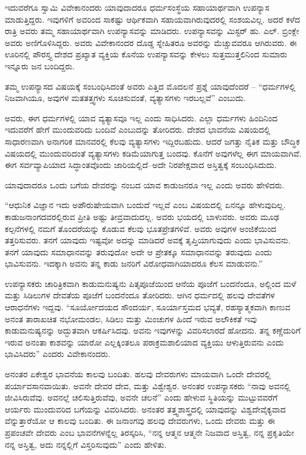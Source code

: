 ಇದುವರೆಗೂ ಸ್ವಾಮಿ ವಿವೇಕಾನಂದರು ಯಾವುದಾದರೂ ಧರ್ಮಸಂಸ್ಥೆಯ ಸಹಾ\break ಯಾರ್ಥವಾಗಿ ಉಪನ್ಯಾಸ ಮಾಡುತ್ತಿದ್ದರು. ಇವುಗಳಿಗೆ ಅವರಿಂದ ಸಾಕಷ್ಟು ಆರ್ಥಿಕವಾಗಿ ಸಹಾಯವಾಗಿರುವುದರಲ್ಲಿ ಸಂಶಯವಿಲ್ಲ. ಅದರೆ ಕಳೆದ ರಾತ್ರಿ ಅವರು ತಮ್ಮ ಸಹಾಯಾರ್\break ಥವಾಗಿ ಉಪನ್ಯಾಸವನ್ನು ಮಾಡಿದರು. ಉಪನ್ಯಾಸವನ್ನು ಮಿಸ್ಟರ್​ ಹು. ಎಲ್​. ಬ್ರಿಂಕ್ಲೇ ಅವರು ಅಣಿಗೊಳಿಸಿದ್ದರು. ಅವರು ವಿವೇಕಾನಂದರ ದೊಡ್ಡ ಸ್ನೇಹಿತರೂ ಅವರನ್ನು ಮೆಚ್ಚುವವರೂ ಆಗಿರುವರು. ಈ ಊರಿನಲ್ಲಿ ಪೌರಸ್ತ್ಯ ದೇಶದ ಪ್ರಖ್ಯಾತ ವ್ಯಕ್ತಿಯ ಕೊನೆಯ ಉಪನ್ಯಾಸವನ್ನು ಕೇಳಲು ಸುತ್ತಮುತ್ತಲಿನಿಂದ ಸುಮಾರು ಇನ್ನೂರು ಜನ ಬಂದಿದ್ದರು.

ತಮ್ಮ ಉಪನ್ಯಾಸದ ವಿಷಯಕ್ಕೆ ಸಂಬಂಧಿಸಿದಂತೆ ಅವರು ಎತ್ತಿದ ಮೊದಲನೆ ಪ್ರಶ್ನೆ ಯಾವುದೆಂದರೆ – “ಧರ್ಮಗಳಲ್ಲಿ ನಿಜವಾಗಿಯೂ, ಅವುಗಳ ಮತತತ್ತ್ವಗಳು ಸೂಚಿಸು\break ವಂತೆ, ವ್ಯತ್ಯಾಸಗಳು ಇರಬಲ್ಲವೆ” ಎಂಬುದು.

ಅವರು, ಈಗ ಧರ್ಮಗಳಲ್ಲಿ ಯಾವ ವ್ಯತ್ಯಾಸವೂ ಇಲ್ಲ ಎಂದು ಸಾಧಿಸಿದರು. ಎಲ್ಲಾ ಧರ್ಮಗಳು ಹಿಂದಿನಿಂದ ಇದುವರೆಗೆ ಹೇಗೆ ಮುಂದುವರಿದು ಬಂದಿವೆ ಎಂಬುದನ್ನು ತೋರಿದರು. ದೇಶದ ಭಾವನೆಯ ವಿಷಯದಲ್ಲಿ ಸಾಧಾರಣವಾಗಿ ಅನಾಗರಿಕ ಮಾನವರಲ್ಲಿ ಕೆಲವು ವ್ಯತ್ಯಾಸಗಳು ಇದ್ದಿರಬಹುದು. ಆದರೆ ಜಗತ್ತು ನೈತಿಕ ಮತ್ತು ಬೌದ್ಧಿಕ ವಿಷಯದಲ್ಲಿ ಮುಂದುವರಿದಂತೆ ವ್ಯತ್ಯಾಸಗಳು ಕಡಿಮೆಯಾಗುತ್ತ ಬಂದವು. ಕೊನೆಗೆ ಅವುಗಳೆಲ್ಲ ಈಗ ಮಾಯವಾಗಿವೆ. ಈಗ ಸರ್ವವ್ಯಾಪಿಯಾದ ಸಿದ್ಧಾಂತವೊಂದು ಜಾರಿಯಲ್ಲಿದೆ–ಅದೇ ನಿರಪೇಕ್ಷವಾದ ಅಸ್ತಿತ್ವಕ್ಕೆ ಸಂಬಂಧಿಸಿದುದು.

ಯಾವುದಾದರೂ ಒಂದು ಬಗೆಯ ದೇವರನ್ನು ನಂಬದ ಯಾವ ಕಾಡುಜನರೂ ಇಲ್ಲ ಎಂದು ಅವರು ಹೇಳಿದರು.

“ಆಧುನಿಕ ವಿಜ್ಞಾನ ಇದು ಅಪೌರುಷೇಯವಾಗಿ ಬಂದುದೆ ಇಲ್ಲವೆ ಎಂಬ ವಿಷಯದಲ್ಲಿ ಏನನ್ನೂ ಹೇಳುವುದಿಲ್ಲ. ಕಾಡುಜನಾಂಗದವರಲ್ಲಿರುವ ಪ್ರೀತಿ ಅಷ್ಟು ತೀವ್ರವಾದುದಲ್ಲ. ಅವರು ಭಯದಲ್ಲಿ ಬಾಳುವರು. ಅವರು ಮೂಢ ಕಲ್ಪನೆಗಳಲ್ಲಿ ನಮಗೆ ತೊಂದರೆಯನ್ನು ಕೊಡುವ ಕೆಲವು ಭೂತಪ್ರೇತಗಳಿವೆ. ಅವರು ಅವುಗಳ ಅಂಜಿಕೆಯಿಂದ ತತ್ತರಿಸುವರು. ತನಗೆ ಯಾವುದು ಇಷ್ಟವೋ ಅದನ್ನು ಮಾಡಿದರೆ ಅವಕ್ಕೆ ತೃಪ್ತಿಯಾಗುವುದು ಎಂದು ಭಾವಿಸುವನು. ತನಗೆ ಯಾವುದು ಸಮಾಧಾನವನ್ನು ತರುವುದೋ ಅದೇ ಆ ಪ್ರೇತಕ್ಕೂ ಸಮಾಧಾನವನ್ನು ತರುವುದು ಎಂದು ಭಾವಿಸುವನು. ಇದಕ್ಕಾಗಿ ಅವನು ತನ್ನ ಕಾಡು ಜನರಿಗೆ ವಿರೋಧವಾಗಿಯಾದರೂ ಕೆಲಸ ಮಾಡುವನು.”

ಉಪನ್ಯಾಸಕರು ಚಾರಿತ್ರಿಕವಾಗಿ ಕಾಡುಮನುಷ್ಯನು ಪಿತೃಪೂಜೆಯಿಂದ ಆನೆಯ ಪೂಜೆಗೆ ಬಂದನೆಂದೂ, ಅಲ್ಲಿಂದ ಮಳೆ ಮತ್ತು ಸಿಡಿಲುಗಳ ದೇವತೆಯ ಪೂಜೆಗೆ ಬಂದ\break ನೆಂದೂ ತೋರಿದರು. ಆಗಿನ ಧರ್ಮದಲ್ಲಿ ಹಲವು ದೇವತೆಗಳ ಆರಾಧನೆಗಳು ಇದ್ದವು. “ಸೂರ್ಯೋದಯದ ಸೌಂದರ್ಯ, ಸೂರ್ಯಾಸ್ತಮದ ಭವ್ಯತೆ, ರಹಸ್ಯಾತ್ಮಕವಾಗಿ ಕಾಣುವ ಅನಂತ ತಾರಾಖಚಿತ ನಭೋಮಂಡಲ, ಸಿಡಿಲು ಮತ್ತು ಮಿಂಚುಗಳ ಹಿಂದೆ ಇರುವ ಅಲೌಕಿಕತೆ ಇವು ಕಾಡುಮನುಷ್ಯನನ್ನು ಅದ್ಭುತವಾಗಿ ಆಕರ್ಷಿಸಿದವು. ಅವನು ಇವುಗಳನ್ನು ವಿವರಿಸಲಾರದೆ ಹೋದನು. ತನ್ನ ಕಣ್ಣೆದುರಿಗೆ ಇರುವ ಅನಂತಾ ಕಾಶವನ್ನು ಯಾರೋ ಎಲ್ಲಕ್ಕಿಂತಲೂ ಪರಾಕ್ರಮಶಾಲಿಯಾದ ವ್ಯಕ್ತಿಯು ಆಳುತ್ತಿರುವನು ಎಂದು ಭಾವಿಸಿದರು” ಎಂದರು ವಿವೇಕಾನಂದರು.

ಅನಂತರ ಏಕೇಶ್ವರ ಭಾವನೆಯ ಕಾಲವು ಬಂದಿತು. ಹಲವು ದೇವರುಗಳು ಮಾಯವಾಗಿ ಒಂದೇ ದೇವರಲ್ಲಿ ಪರ್ಯಾವಸಾನವಾಯಿತು. ಅವನೇ ದೇವರ ದೇವ, ಮತ್ತು ವಿಶ್ವೇಶ್ವರ. ಅನಂತರ ಉಪನ್ಯಾಸಕರು “ನಾವು ಅವನಲ್ಲಿ ಜೀವಿಸಿರುವೆವು. ಅವನಲ್ಲೆ ಚಲಿಸುತ್ತಿರುವೆವು, ಅವನೇ ಚಲನೆ” ಎಂದು ಹೇಳುವ ಸ್ಥಿತಿಯನ್ನು ಮುಟ್ಟುವವರೆಗೆ ಆರ್ಯರು ಮುಂದುವರಿದ ಬಗೆಯನ್ನು ವಿವರಿಸಿದರು. ಅನಂತರ ತತ್ತ್ವಶಾಸ್ತ್ರದಲ್ಲಿ ಯಾವು\break ದನ್ನು ವಿಶ್ವದೇವೈಕ್ಯವಾದ  ವೆನ್ನುತ್ತಾರೆಯೋ ಆ ಕಾಲವು ಬಂದಿತು. ಈ ಜನಾಂಗವು ಹಲವು ದೇವರುಗಳು, ಒಂದು ದೇವರು ಮತ್ತು ಈ ಪ್ರಪಂಚವೇ ದೇವರು ಎಂಬ ಭಾವನೆಗಳನ್ನೆಲ್ಲ ತಿರಸ್ಕರಿಸಿ, “ನನ್ನ ಆತ್ಮನ ಆತ್ಮನೇ ನಿಜವಾದ ಅಸ್ತಿತ್ವ, ನನ್ನ ಪ್ರಕೃತಿಯೇ ನನ್ನ ಅಸ್ತಿತ್ವ, ಅದು ನನ್ನಲ್ಲಿಗೆ ವಿಸ್ತರಿಸುವುದು” ಎಂದು ಹೇಳಿತು.

